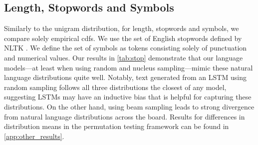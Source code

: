 \documentclass[11pt,a4paper]{article}
\begin{document}
\subsection{Length, Stopwords and Symbols}


\begin{table*}
  \centering
  \small
  \caption{ KS metrics ($D_p$) between empirical length, stopword, and symbol distributions of test set and model generated text. $p$-values (estimated using Monte Carlo simulations \cite{monte_carlo_KS}) for all  KS metrics are $\ll 0.001$.}
  \label{tab:stop}
  \vspace{-1em}
\end{table*}

Similarly to the unigram distribution, for length, stopwords and symbols, we compare solely empirical cdfs. 
We use the set of English stopwords defined by NLTK \cite{nltk}. We define the set of symbols as tokens consisting solely of punctuation and numerical values. 
Our results in \cref{tab:stop} demonstrate that our language models---at least when using random and nucleus sampling---mimic these natural language distributions quite well. Notably, text generated from an LSTM using random sampling follows all three distributions the closest of any model, suggesting LSTMs may have an inductive bias that is helpful for capturing these distributions. On the other hand, using beam sampling leads to strong divergence from natural language distributions across the board.  Results for differences in distribution means in the permutation testing framework can be found in \cref{app:other_results}.
\end{document}

